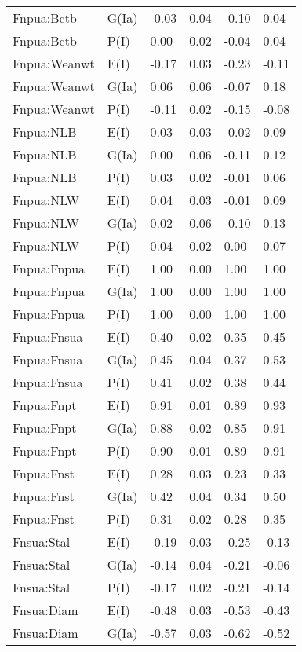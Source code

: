 \begin{center}
\begin{longtable}{|p{1.1in}|p{0.7in}|p{0.7in}|p{0.6in}|p{0.6in}|p{0.6in}|}
  Fnpua:Bctb & G(Ia) & -0.03 & 0.04 & -0.10 & 0.04 \\ 
  Fnpua:Bctb & P(I) & 0.00 & 0.02 & -0.04 & 0.04 \\ 
  Fnpua:Weanwt & E(I) & -0.17 & 0.03 & -0.23 & -0.11 \\ 
  Fnpua:Weanwt & G(Ia) & 0.06 & 0.06 & -0.07 & 0.18 \\ 
  Fnpua:Weanwt & P(I) & -0.11 & 0.02 & -0.15 & -0.08 \\ 
  Fnpua:NLB & E(I) & 0.03 & 0.03 & -0.02 & 0.09 \\ 
  Fnpua:NLB & G(Ia) & 0.00 & 0.06 & -0.11 & 0.12 \\ 
  Fnpua:NLB & P(I) & 0.03 & 0.02 & -0.01 & 0.06 \\ 
  Fnpua:NLW & E(I) & 0.04 & 0.03 & -0.01 & 0.09 \\ 
  Fnpua:NLW & G(Ia) & 0.02 & 0.06 & -0.10 & 0.13 \\ 
  Fnpua:NLW & P(I) & 0.04 & 0.02 & 0.00 & 0.07 \\ 
  Fnpua:Fnpua & E(I) & 1.00 & 0.00 & 1.00 & 1.00 \\ 
  Fnpua:Fnpua & G(Ia) & 1.00 & 0.00 & 1.00 & 1.00 \\ 
  Fnpua:Fnpua & P(I) & 1.00 & 0.00 & 1.00 & 1.00 \\ 
  Fnpua:Fnsua & E(I) & 0.40 & 0.02 & 0.35 & 0.45 \\ 
  Fnpua:Fnsua & G(Ia) & 0.45 & 0.04 & 0.37 & 0.53 \\ 
  Fnpua:Fnsua & P(I) & 0.41 & 0.02 & 0.38 & 0.44 \\ 
  Fnpua:Fnpt & E(I) & 0.91 & 0.01 & 0.89 & 0.93 \\ 
  Fnpua:Fnpt & G(Ia) & 0.88 & 0.02 & 0.85 & 0.91 \\ 
  Fnpua:Fnpt & P(I) & 0.90 & 0.01 & 0.89 & 0.91 \\ 
  Fnpua:Fnst & E(I) & 0.28 & 0.03 & 0.23 & 0.33 \\ 
  Fnpua:Fnst & G(Ia) & 0.42 & 0.04 & 0.34 & 0.50 \\ 
  Fnpua:Fnst & P(I) & 0.31 & 0.02 & 0.28 & 0.35 \\ 
  Fnsua:Stal & E(I) & -0.19 & 0.03 & -0.25 & -0.13 \\ 
  Fnsua:Stal & G(Ia) & -0.14 & 0.04 & -0.21 & -0.06 \\ 
  Fnsua:Stal & P(I) & -0.17 & 0.02 & -0.21 & -0.14 \\ 
  Fnsua:Diam & E(I) & -0.48 & 0.03 & -0.53 & -0.43 \\ 
  Fnsua:Diam & G(Ia) & -0.57 & 0.03 & -0.62 & -0.52 \\ 

\end{longtable}
\end{center}
